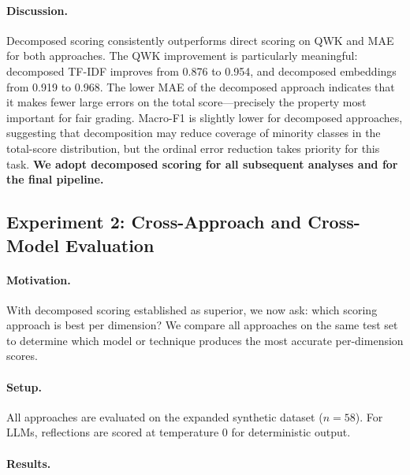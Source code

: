 \documentclass[11pt]{article}
\begin{document}
\paragraph{Discussion.} Decomposed scoring consistently outperforms direct scoring on QWK and MAE for both approaches. The QWK improvement is particularly meaningful: decomposed TF-IDF improves from 0.876 to 0.954, and decomposed embeddings from 0.919 to 0.968. The lower MAE of the decomposed approach indicates that it makes fewer large errors on the total score—precisely the property most important for fair grading. Macro-F1 is slightly lower for decomposed approaches, suggesting that decomposition may reduce coverage of minority classes in the total-score distribution, but the ordinal error reduction takes priority for this task. \textbf{We adopt decomposed scoring for all subsequent analyses and for the final pipeline.}

\subsection{Experiment 2: Cross-Approach and Cross-Model Evaluation}

\paragraph{Motivation.} With decomposed scoring established as superior, we now ask: which scoring approach is best per dimension? We compare all approaches on the same test set to determine which model or technique produces the most accurate per-dimension scores.

\paragraph{Setup.} All approaches are evaluated on the expanded synthetic dataset ($n = 58$). For LLMs, reflections are scored at temperature 0 for deterministic output.

\paragraph{Results.}
\end{document}
